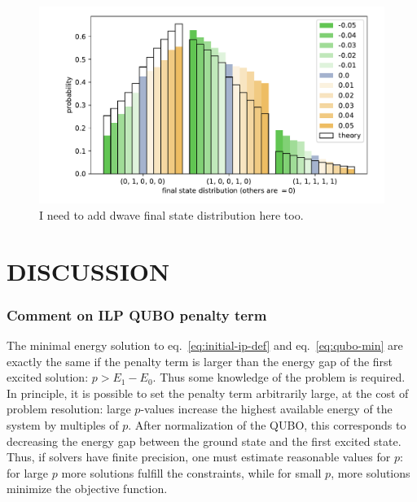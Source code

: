 \documentclass[prd,twocolumn,tightenlines,preprintnumbers,showpacs,superscriptaddress,notitlepage,nofootinbib,eqsecnum,floatfix,longbibliography,aps,10pt]{revtex4-2}
\begin{document}
\begin{figure}
	\centering
	\includegraphics[width=\columnwidth]{./new_figures/final_state_distribution.pdf}
	\caption{{\color{red}I need to add dwave final state distribution here too.}}
	\label{fig:final_state_distribution}
\end{figure}




\section{DISCUSSION}
\label{sec:discussion}

\subsubsection{Comment on ILP QUBO penalty term}
\label{sec:methods:ilp-qubo-comments}

The minimal energy solution to eq.~\eqref{eq:initial-ip-def} and eq.~\eqref{eq:qubo-min} are exactly the same if the penalty term is larger than the energy gap of the first excited solution: $p > E_1 - E_0$.
Thus some knowledge of the problem is required.
In principle, it is possible to set the penalty term arbitrarily large, at the cost of problem resolution: large $p$-values increase the highest available energy of the system by multiples of $p$.
After normalization of the QUBO, this corresponds to decreasing the energy gap between the ground state and the first excited state.
Thus, if solvers have finite precision, one must estimate reasonable values for $p$: for large $p$ more solutions fulfill the constraints, while for small $p$, more solutions minimize the objective function.
\end{document}
